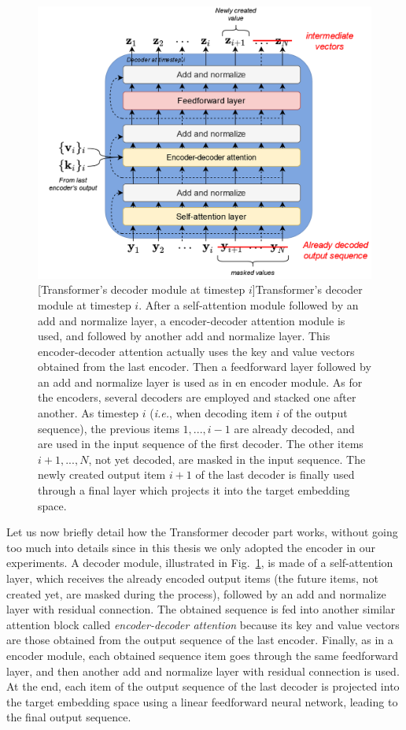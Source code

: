 \begin{figure}[t]
    \begin{center}
    \includegraphics[width=0.85\linewidth]{Images/chap3/transformerDecoder.png}
    [Transformer's decoder module at timestep $i$]{Transformer's decoder module at timestep $i$. After a self-attention module followed by an add and normalize layer, a encoder-decoder attention module is used, and followed by another add and normalize layer. This encoder-decoder attention actually uses the key and value vectors obtained from the last encoder. Then a feedforward layer followed by an add and normalize layer is used as in en encoder module. As for the encoders, several decoders are employed and stacked one after another. As timestep $i$ (\emph{i.e.}, when decoding item $i$ of the output sequence), the previous items $1, ..., i-1$ are already decoded, and are used in the input sequence of the first decoder. The other items $i+1, ..., N$, not yet decoded, are masked in the input sequence. The newly created output item $i+1$ of the last decoder is finally used through a final layer which projects it into the target embedding space.}
    \label{fig:transformerDecoder}
    \end{center}
\end{figure}

Let us now briefly detail how the Transformer decoder part works, without going too much into details since in this thesis we only adopted the encoder in our experiments. A decoder module, illustrated in Fig.~\ref{fig:transformerDecoder}, is made of a self-attention layer, which receives the already encoded output items (the future items, not created yet, are masked during the process), followed by an add and normalize layer with residual connection. The obtained sequence is fed into another similar attention block called \textit{encoder-decoder attention} because its key and value vectors are those obtained from the output sequence of the last encoder. Finally, as in a encoder module, each obtained sequence item goes through the same feedforward layer, and then another add and normalize layer with residual connection is used. At the end, each item of the output sequence of the last decoder is projected into the target embedding space using a linear feedforward neural network, leading to the final output sequence.

